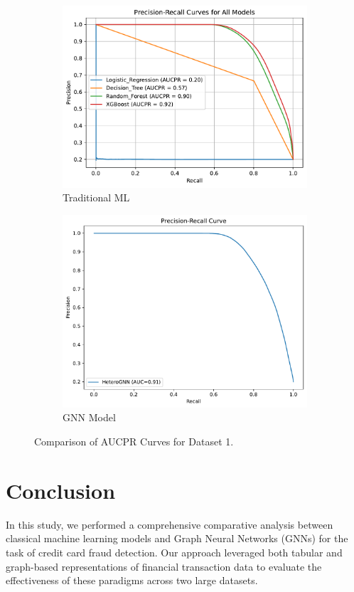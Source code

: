 \documentclass[conference]{IEEEtran}
\begin{document}
\begin{figure}[htbp]
    \centering
    \begin{subfigure}{\columnwidth}
        \centering
        \includegraphics[width=0.7\columnwidth]{AUCPR Curve ML DS2.pdf}
        \caption{Traditional ML}
        \label{fig:aucpr-ml}
    \end{subfigure}
    
    \vspace{0.3cm}
    
    \begin{subfigure}{\columnwidth}
        \centering
        \includegraphics[width=0.7\columnwidth]{AUCPR GNN DS2.pdf}
        \caption{GNN Model}
        \label{fig:aucpr-gnn}
    \end{subfigure}
    
    \caption{Comparison of AUCPR Curves for Dataset 1.}
    \label{fig:aucpr-comparison-ds2}
\end{figure}


\newpage

\section{Conclusion}
In this study, we performed a comprehensive comparative analysis between classical machine learning models and Graph Neural Networks (GNNs) for the task of credit card fraud detection. Our approach leveraged both tabular and graph-based representations of financial transaction data to evaluate the effectiveness of these paradigms across two large datasets.
\end{document}
